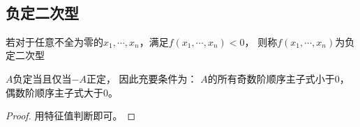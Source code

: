 ~






\subsection{负定二次型}

\begin{definition}[负定二次型]
  若对于任意不全为零的$x_1,\cdots,x_n$，满足$f(x_1,\cdots,x_n) < 0$，
  则称$f(x_1,\cdots,x_n)$为负定二次型
\end{definition}

\begin{theorem}[负定二次型的充要条件]
  $A$负定当且仅当$-A$正定，
  因此充要条件为：
  $A$的所有奇数阶顺序主子式小于$0$，
  偶数阶顺序主子式大于$0$。
\end{theorem}

\begin{proof}
  用特征值判断即可。
\end{proof}








